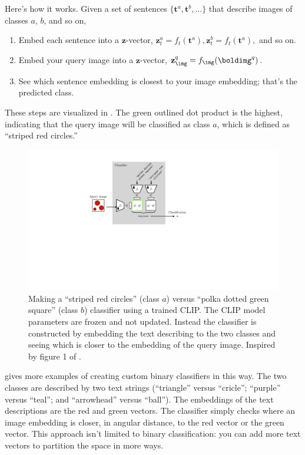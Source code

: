 Here's how it works. Given a set of sentences $\{\mathbf{t}^{a}, \mathbf{t}^{b}, \ldots\}$ that describe images of classes $a$, $b$, and so on,
\begin{enumerate}
    \item Embed each sentence into a $\mathbf{z}$-vector, $\mathbf{z}_t^{a} = f_t(\mathbf{t}^{a}), \mathbf{z}_t^{b} = f_t(\mathbf{t}^{a}),$ and so on.
    \item Embed your query image into a $\mathbf{z}$-vector, $\mathbf{z}_{\img}^{q} = f_{\img}(\boldimg^{q})$.
    \item See which sentence embedding is closest to your image embedding; that's the predicted class.
\end{enumerate}
These steps are visualized in \fig{\ref{fig:vision_and_language:clip_inference}}. The green outlined dot product is the highest, indicating that the query image will be classified as class $a$, which is defined as ``striped red circles.''
\begin{figure}[h]
\centerline{
    \includegraphics[width=0.75\linewidth]{figures/vision_and_language/clip_inference_fig.pdf}
}
\caption{Making a ``striped red circles'' (class $a$) versus ``polka dotted green square'' (class $b$) classifier using a trained CLIP. The CLIP model parameters are frozen and not updated. Instead the classifier is constructed by embedding the text describing to the two classes and seeing which is closer to the embedding of the query image. Inspired by figure 1 of \cite{radford2021learning}.}
\label{fig:vision_and_language:clip_inference}
\end{figure}
\Fig{\ref{fig:vision_and_language:clip_clocks}} gives more examples of creating custom binary classifiers in this way. The two classes are described by two text strings (``triangle'' versus ``cricle''; ``purple'' versus ``teal''; and ``arrowhead'' versus ``ball''). The embeddings of the text descriptions are the red and green vectors. The classifier simply checks where an image embedding is closer, in angular distance, to the red vector or the green vector. This approach isn't limited to binary classification: you can add more text vectors to partition the space in more ways.

